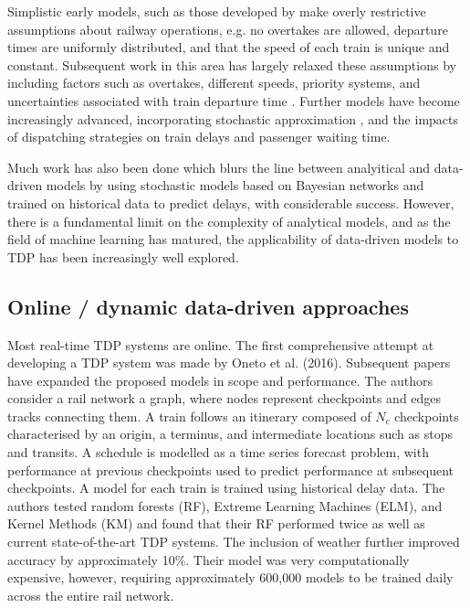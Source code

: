 \documentclass[12pt,a4paper]{article}
\begin{document}
Simplistic early models, such as those developed by \cite{frank_1966} make overly restrictive assumptions about railway operations, e.g. no overtakes are allowed, departure times are uniformly distributed, and that the speed of each train is unique and constant. Subsequent work in this area has largely relaxed these assumptions by including factors such as overtakes, different speeds, priority systems, and uncertainties associated with train departure time \cite{petersen_1974,chen_harker_1990}. Further models have become increasingly advanced, incorporating stochastic approximation \cite{carey_kwiecinski_1994}, and the impacts of dispatching strategies on train delays and passenger waiting time.

Much work has also been done which blurs the line between analyitical and data-driven models \cite{kecman_corman_meng_2015,corman_kecman_2018} by using stochastic models based on Bayesian networks and trained on historical data to predict delays, with considerable success. However, there is a fundamental limit on the complexity of analytical models, and as the field of machine learning has matured, the applicability of data-driven models to TDP has been increasingly well explored. 

\subsection{Online / dynamic data-driven approaches}

Most real-time TDP systems are online. The first comprehensive attempt at developing a TDP system was made by Oneto et al. (2016). Subsequent papers \cite{oneto_et_al_2017,oneto_et_al_2019} have expanded the proposed models in scope and performance.
The authors consider a rail network a graph, where nodes represent checkpoints and edges tracks connecting them. A train follows an itinerary composed of $N_c$ checkpoints characterised by an origin, a terminus, and intermediate locations such as stops and transits. A schedule is modelled as a time series forecast problem, with performance at previous checkpoints used to predict performance at subsequent checkpoints. A model for each train is trained using historical delay data. The authors tested random forests (RF), Extreme Learning Machines (ELM), and Kernel Methods (KM) and found that their RF performed twice as well as current state-of-the-art TDP systems. The inclusion of weather further improved accuracy by approximately 10\%. Their model was very computationally expensive, however, requiring approximately 600,000 models to be trained daily across the entire rail network. 
\end{document}
